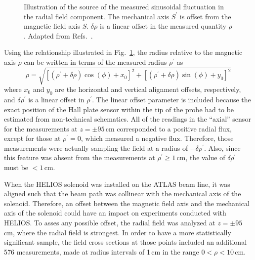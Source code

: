 \begin{figure}%
\centering
{}
\caption[Illustration of the source of the measured sinusoidal fluctuation in the radial field component]{Illustration of the source of the measured sinusoidal fluctuation in the radial field component.  The mechanical axis $S^\prime$ is offset from the magnetic field axis $S$.  $\delta \rho$ is a linear offset in the measured quantity $\rho$.  Adapted from Refs.~\cite{Lighthall_2008SLM,Vann_2008}.}%
\label{map_off}%
\end{figure}

Using the relationship illustrated in Fig.~\ref{map_off}, the radius relative to the magnetic axis $\rho$ can be written in terms of the measured radius $\rho^\prime$ as
\begin{equation}
\rho=\sqrt{[(\rho^\prime + \delta \rho) \cos(\phi)+x_0]^2+[(\rho^\prime + \delta \rho)\sin(\phi)+y_0]^2}
\label{rho_offset}
\end{equation}
where $x_0$ and $y_0$ are the horizontal and vertical alignment offsets, respectively, and $\delta \rho^\prime$ is a linear offset in $\rho^\prime$.  The linear offset parameter is included because the exact position of the Hall plate sensor within the tip of the probe had to be estimated from non-technical schematics.  All of the readings in the ``axial'' sensor for the measurements at $z= \pm 95$\,cm corresponded to a positive radial flux, except for those at $\rho^\prime=0$, which measured a negative flux.  Therefore, those measurements were actually sampling the field at a radius of $-\delta \rho^\prime$.  Also, since this feature was absent from the measurements at $\rho^\prime \geq 1$\,cm, the value of $\delta \rho^\prime$ must be $< 1$\,cm.

When the HELIOS solenoid was installed on the ATLAS beam line, it was aligned such that the beam path was collinear with the mechanical axis of the solenoid.  Therefore, an offset between the magnetic field axis and the mechanical axis of the solenoid could have an impact on experiments conducted with HELIOS.  To asses any possible offset, the radial field was analyzed at $z= \pm 95$\,cm, where the radial field is strongest.  In order to have a more statistically significant sample, %
 the field cross sections at those points included an additional 576 measurements, made at radius intervals of 1\,cm in the range $0<\rho<10$\,cm.  

